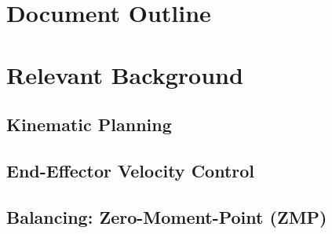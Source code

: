 	\section{Document Outline} 
	
			
			
			
			
			
			
			

		
	\section{Relevant Background}\label{sec:background}
    		
    	
		\subsection{Kinematic Planning}
			
		\subsection{End-Effector Velocity Control}
			
%			
		\subsection{Balancing: Zero-Moment-Point (ZMP)}
			
	

